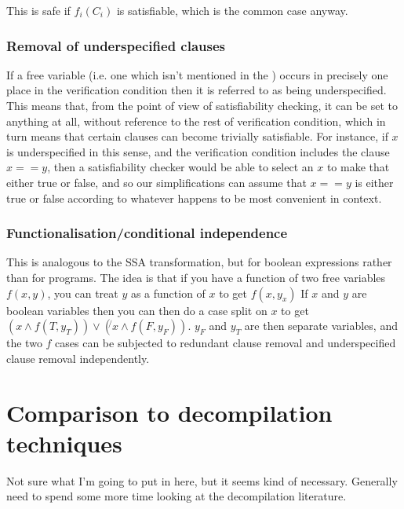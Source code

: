 This is safe if $f_i(C_i)$ is satisfiable, which is the common case anyway.

\subsubsection{Removal of underspecified clauses}

If a free variable (i.e. one which isn't mentioned in the \StateMachines) occurs in precisely one place in the verification condition then it is referred to as being underspecified.
This means that, from the point of view of satisfiability checking, it can be set to anything at all, without reference to the rest of verification condition, which in turn means that certain clauses can become trivially satisfiable.
For instance, if $x$ is underspecified in this sense, and the verification condition includes the clause $x == y$, then a satisfiability checker would be able to select an $x$ to make that either true or false, and so our simplifications can assume that $x == y$ is either true or false according to whatever happens to be most convenient in context.

\subsubsection{Functionalisation/conditional independence}

This is analogous to the SSA transformation, but for boolean expressions rather than for programs.
The idea is that if you have a function of two free variables $f(x, y)$, you can treat $y$ as a function of $x$ to get $f(x, y_x)$
If $x$ and $y$ are boolean variables then you can then do a case split on $x$ to get $(x \wedge f(T, y_T)) \vee (\not{}x \wedge f(F, y_F))$.
$y_F$ and $y_T$ are then separate variables, and the two $f$ cases can be subjected to redundant clause removal and underspecified clause removal independently.





\section{Comparison to decompilation techniques}
Not sure what I'm going to put in here, but it seems kind of necessary.
Generally need to spend some more time looking at the decompilation literature.

